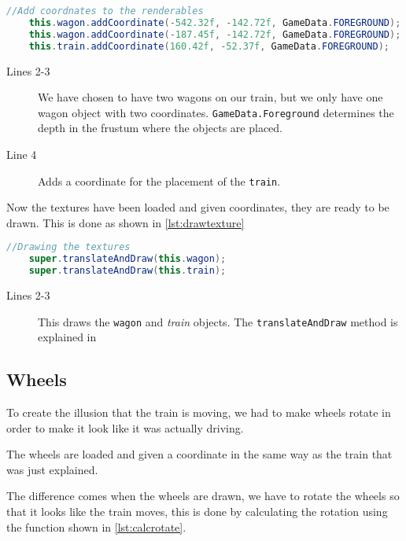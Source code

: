 \begin{lstlisting}[language=java,firstnumber=1,caption={Placing the texture on the screen.},label=lst:addcoordinate] 
	//Add coordnates to the renderables
	this.wagon.addCoordinate(-542.32f, -142.72f, GameData.FOREGROUND);
	this.wagon.addCoordinate(-187.45f, -142.72f, GameData.FOREGROUND);
	this.train.addCoordinate(160.42f, -52.37f, GameData.FOREGROUND);
\end{lstlisting}

\begin{description}
\item[Lines 2-3] We have chosen to have two wagons on our train, but we only have one wagon object with two coordinates. \lstinline|GameData.Foreground| determines the depth in the frustum where the objects are placed.
\item[Line 4] Adds a coordinate for the placement of the \lstinline|train|.
\end{description}

Now the textures have been loaded and given coordinates, they are ready to be drawn. This is done as shown in \autoref{lst:drawtexture}

\begin{lstlisting}[language=java,firstnumber=1,caption={Drawing the texture on the screen.},label=lst:drawtexture] 
	//Drawing the textures
	super.translateAndDraw(this.wagon);
	super.translateAndDraw(this.train);
\end{lstlisting}

\begin{description}
\item[Lines 2-3] This draws the \lstinline|wagon| and \textit{train} objects. The \lstinline|translateAndDraw| method is explained in 
\end{description}

\subsection{Wheels}

To create the illusion that the train is moving, we had to make wheels rotate in order to make it look like it was actually driving. 

The wheels are loaded and given a coordinate in the same way as the train that was just explained.

The difference comes when the wheels are drawn, we have to rotate the wheels so that it looks like the train moves, this is done by calculating the rotation using the function shown in \autoref{lst:calcrotate}.


